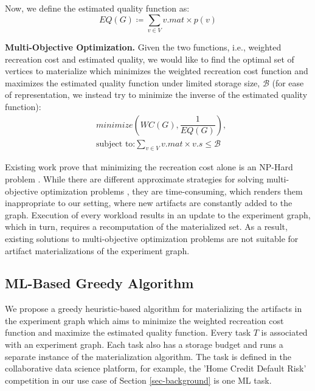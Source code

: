 Now, we define the estimated quality function as:
\[
EQ(G) \coloneqq  \sum\limits_{v \in V}  v.mat \times p(v)
\]

\textbf{Multi-Objective Optimization.}
Given the two functions, i.e., weighted recreation cost and estimated quality, we would like to find the optimal set of vertices to materialize which minimizes the weighted recreation cost function and maximizes the estimated quality function under limited storage size, $\mathcal{B}$ (for ease of representation, we instead try to minimize the inverse of the estimated quality function):
\begin{equation}
\begin{split}
& minimize(WC(G), \dfrac{1}{EQ(G)}), \\
& \text{subject to:} \sum\limits_{v \in V} v.mat \times v.s \leq \mathcal{B}
\end{split}
\end{equation}

Existing work prove that minimizing the recreation cost alone is an NP-Hard problem \cite{bhattacherjee2015principles}.
While there are different approximate strategies for solving multi-objective optimization problems \cite{coello2007evolutionary}, they are time-consuming, which renders them inappropriate to our setting, where new artifacts are constantly added to the graph.
Execution of every workload results in an update to the experiment graph, which in turn, requires a recomputation of the materialized set.
As a result, existing solutions to multi-objective optimization problems are not suitable for artifact materializations of the experiment graph.

\subsection{ML-Based Greedy Algorithm}\label{subsec-ml-based-materialization}
We propose a greedy heuristic-based algorithm for materializing the artifacts in the experiment graph which aims to minimize the weighted recreation cost function and maximize the estimated quality function.
Every task $T$ is associated with an experiment graph.
Each task also has a storage budget and runs a separate instance of the materialization algorithm.
The task is defined in the collaborative data science platform, for example, the 'Home Credit Default Risk' competition in our use case of Section \ref{sec-background} is one ML task.

